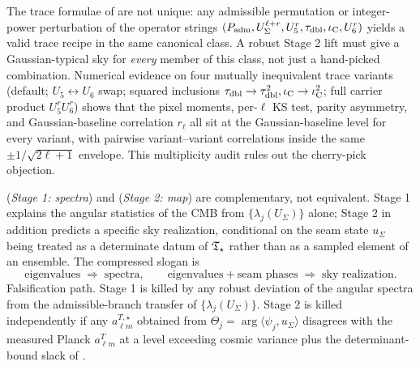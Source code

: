 \begin{remark}
\label{rem:multiplicity-audit}
The trace formulae of  are not unique: any admissible
permutation or integer-power perturbation of the operator strings
$(P_{\mathrm{adm}},U_\Sigma^{\ell+r},U_5^{r},\tau_{\mathrm{dbl}},\iota_{\mathrm C},U_6^{r})$ yields a valid trace recipe in the same
canonical class. A robust Stage 2 lift must give a Gaussian-typical sky for \emph{every} member of
this class, not just a hand-picked combination. Numerical evidence on four mutually inequivalent
trace variants (default; $U_5\leftrightarrow U_6$ swap; squared inclusions
$\tau_{\mathrm{dbl}}\to\tau_{\mathrm{dbl}}^2,\iota_{\mathrm C}\to\iota_{\mathrm C}^2$; full carrier product $U_5^rU_6^r$) shows that the pixel
moments, per-$\ell$ KS test, parity asymmetry, and Gaussian-baseline correlation $r_\ell$ all sit
at the Gaussian-baseline level for every variant, with pairwise variant–variant correlations
inside the same $\pm1/\sqrt{2\ell+1}$ envelope. This multiplicity audit rules out the cherry-pick
objection.
\end{remark}

\begin{remark}
 (\emph{Stage 1: spectra}) and
 (\emph{Stage 2: map}) are complementary, not equivalent.
Stage 1 explains the angular statistics of the CMB from $\{\lambda_j(U_\Sigma)\}$ alone; Stage 2 in
addition predicts a specific sky realization, conditional on the seam state $u_\Sigma$ being treated
as a determinate datum of $\mathfrak T_{\star}$ rather than as a sampled element of an ensemble. The compressed
slogan is
\[
\text{eigenvalues}\;\Rightarrow\;\text{spectra},\qquad
\text{eigenvalues}+\text{seam phases}\;\Rightarrow\;\text{sky realization.}
\]
Falsification path. Stage 1 is killed by any robust deviation of the angular spectra from the
admissible-branch transfer of $\{\lambda_j(U_\Sigma)\}$. Stage 2 is killed independently if any
$a_{\ell m}^{T,\star}$ obtained from $\Theta_j=\arg\langle\psi_j,u_\Sigma\rangle$ disagrees with the
measured Planck $a_{\ell m}^T$ at a level exceeding cosmic variance plus the determinant-bound
slack of .
\end{remark}

